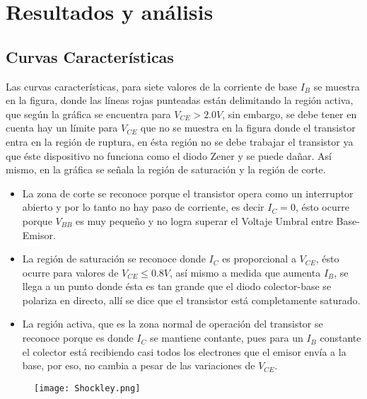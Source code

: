 
\section{Resultados y análisis}
\subsection{Curvas Características}
Las curvas características, para siete valores de la corriente de base $I_{B}$ se muestra en la figura, donde las líneas rojas punteadas están delimitando la región activa, que según la gráfica se encuentra para $V_{CE}>2.0 V$, sin embargo, se debe tener en cuenta hay un límite para $V_{CE}$ que no se muestra en la figura donde el transistor entra en la región de ruptura, en ésta región no se debe trabajar el transistor ya que éste dispositivo no funciona como el diodo Zener y se puede dañar. Así mismo, en la gráfica se señala la región de saturación y la región de corte.\\
\begin{itemize}

\item La zona de corte se reconoce porque el transistor opera como un interruptor abierto y por lo tanto no hay paso de corriente, es decir $I_{C}=0$, ésto ocurre porque $V_{BB}$ es muy pequeño y no logra superar el Voltaje Umbral entre Base-Emisor.\\
\item La región de saturación se reconoce donde $I_{C}$ es proporcional a $V_{CE}$, ésto ocurre para valores de $V_{CE}\leq 0.8 V$, así mismo a medida que aumenta $I_{B}$, se llega a un punto donde ésta es tan grande que el diodo colector-base se polariza en directo, allí se dice que el transistor está completamente saturado.\\
\item La región activa, que es la zona normal de operación del transistor se reconoce porque es donde $I_{C}$ se mantiene contante, pues para un $I_{B}$ constante el colector está recibiendo casi todos los electrones que el emisor envía a la base, por eso, no cambia a pesar de las variaciones de $V_{CE}$.
\end{itemize}


\begin{figure}[h]
    \centering
    \texttt{[image: Shockley.png]}
    \caption{}
    \label{fig:Curvas}
\end{figure}

